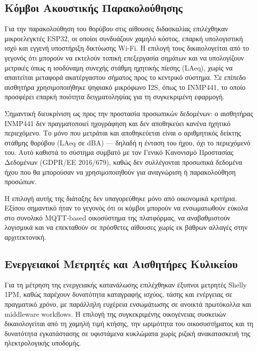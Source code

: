 \subsection{Κόμβοι Ακουστικής Παρακολούθησης}
Για την παρακολούθηση του θορύβου στις αίθουσες διδασκαλίας επιλέχθηκαν μικροελεγκτές \textlatin{ESP32}, οι οποίοι συνδυάζουν χαμηλό κόστος, επαρκή υπολογιστική ισχύ και εγγενή υποστήριξη δικτύωσης \textlatin{Wi-Fi}. Η επιλογή τους δικαιολογείται από το γεγονός ότι μπορούν να εκτελούν τοπική επεξεργασία σημάτων και να υπολογίζουν μετρικές όπως η ισοδύναμη συνεχής στάθμη ηχητικής πίεσης (\textlatin{LAeq}), χωρίς να απαιτείται μεταφορά ακατέργαστου σήματος προς το κεντρικό σύστημα. Σε επίπεδο αισθητήρα χρησιμοποιήθηκε ψηφιακό μικρόφωνο \textlatin{I2S}, όπως το \textlatin{INMP441}, το οποίο προσφέρει επαρκή ποιότητα δειγματοληψίας για τη συγκεκριμένη εφαρμογή.

Σημαντική διευκρίνιση ως προς την προστασία προσωπικών δεδομένων: ο αισθητήρας \textlatin{INMP441} δεν πραγματοποιεί ηχογράφηση και δεν αποθηκεύει κανένα ηχητικό περιεχόμενο. Το μόνο που μετράται και αποθηκεύεται είναι ο αριθμητικός δείκτης στάθμης θορύβου (\textlatin{LAeq} σε \textlatin{dBA}) --- δηλαδή η ένταση του ήχου, όχι το περιεχόμενό του. Αυτό καθιστά το σύστημα συμβατό με τον Γενικό Κανονισμό Προστασίας Δεδομένων (\textlatin{GDPR}/\textlatin{ΕΕ 2016/679}), καθώς δεν συλλέγονται προσωπικά δεδομένα ήχου που θα μπορούσαν να χρησιμοποιηθούν για αναγνώριση ή παρακολούθηση προσώπων.

Η επιλογή αυτής της διάταξης δεν υπαγορεύθηκε μόνο από οικονομικά κριτήρια. Εξίσου σημαντικό ήταν το γεγονός ότι οι κόμβοι μπορούν να ενσωματωθούν εύκολα στο συνολικό \textlatin{MQTT-based} οικοσύστημα της πλατφόρμας, να αναβαθμιστούν λογισμικά και να επεκταθούν σε πρόσθετες αίθουσες χωρίς εκ βάθρων αλλαγές στην αρχιτεκτονική.

\subsection{Ενεργειακοί Μετρητές και Αισθητήρες Κυλικείου}
Για τη μέτρηση της ενεργειακής κατανάλωσης επιλέχθηκαν έξυπνοι μετρητές \textlatin{Shelly 1PM}, καθώς παρέχουν δυνατότητα καταγραφής ισχύος, τάσης και ενέργειας σε πραγματικό χρόνο, με παράλληλη ευχέρεια ενσωμάτωσης σε ανοικτά πρωτόκολλα και \textlatin{middleware workflows}. Η επιλογή της συγκεκριμένης οικογένειας συσκευών δικαιολογείται από τη χαμηλή τιμή κτήσης, την ωριμότητα του οικοσυστήματος και τη δυνατότητα εγκατάστασης σε υφιστάμενα κυκλώματα χωρίς ριζική ανακατασκευή της ηλεκτρολογικής υποδομής.

